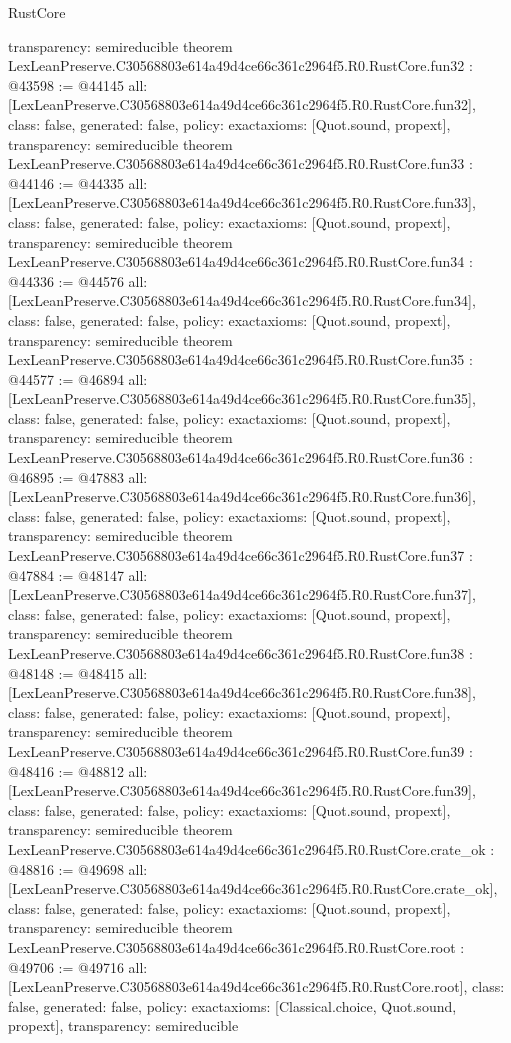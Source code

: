 \begin{lexlean}{RustCore}
\begin{coremodule}
{  transparency: semireducible
}
theorem LexLeanPreserve.C30568803e614a49d4ce66c361c2964f5.R0.RustCore.fun32 : @43598 := @44145 {
  all: [LexLeanPreserve.C30568803e614a49d4ce66c361c2964f5.R0.RustCore.fun32],
  class: false,
  generated: false,
  policy: exact{axioms: [Quot.sound, propext]},
  transparency: semireducible
}
theorem LexLeanPreserve.C30568803e614a49d4ce66c361c2964f5.R0.RustCore.fun33 : @44146 := @44335 {
  all: [LexLeanPreserve.C30568803e614a49d4ce66c361c2964f5.R0.RustCore.fun33],
  class: false,
  generated: false,
  policy: exact{axioms: [Quot.sound, propext]},
  transparency: semireducible
}
theorem LexLeanPreserve.C30568803e614a49d4ce66c361c2964f5.R0.RustCore.fun34 : @44336 := @44576 {
  all: [LexLeanPreserve.C30568803e614a49d4ce66c361c2964f5.R0.RustCore.fun34],
  class: false,
  generated: false,
  policy: exact{axioms: [Quot.sound, propext]},
  transparency: semireducible
}
theorem LexLeanPreserve.C30568803e614a49d4ce66c361c2964f5.R0.RustCore.fun35 : @44577 := @46894 {
  all: [LexLeanPreserve.C30568803e614a49d4ce66c361c2964f5.R0.RustCore.fun35],
  class: false,
  generated: false,
  policy: exact{axioms: [Quot.sound, propext]},
  transparency: semireducible
}
theorem LexLeanPreserve.C30568803e614a49d4ce66c361c2964f5.R0.RustCore.fun36 : @46895 := @47883 {
  all: [LexLeanPreserve.C30568803e614a49d4ce66c361c2964f5.R0.RustCore.fun36],
  class: false,
  generated: false,
  policy: exact{axioms: [Quot.sound, propext]},
  transparency: semireducible
}
theorem LexLeanPreserve.C30568803e614a49d4ce66c361c2964f5.R0.RustCore.fun37 : @47884 := @48147 {
  all: [LexLeanPreserve.C30568803e614a49d4ce66c361c2964f5.R0.RustCore.fun37],
  class: false,
  generated: false,
  policy: exact{axioms: [Quot.sound, propext]},
  transparency: semireducible
}
theorem LexLeanPreserve.C30568803e614a49d4ce66c361c2964f5.R0.RustCore.fun38 : @48148 := @48415 {
  all: [LexLeanPreserve.C30568803e614a49d4ce66c361c2964f5.R0.RustCore.fun38],
  class: false,
  generated: false,
  policy: exact{axioms: [Quot.sound, propext]},
  transparency: semireducible
}
theorem LexLeanPreserve.C30568803e614a49d4ce66c361c2964f5.R0.RustCore.fun39 : @48416 := @48812 {
  all: [LexLeanPreserve.C30568803e614a49d4ce66c361c2964f5.R0.RustCore.fun39],
  class: false,
  generated: false,
  policy: exact{axioms: [Quot.sound, propext]},
  transparency: semireducible
}
theorem LexLeanPreserve.C30568803e614a49d4ce66c361c2964f5.R0.RustCore.crate_ok : @48816 := @49698 {
  all: [LexLeanPreserve.C30568803e614a49d4ce66c361c2964f5.R0.RustCore.crate_ok],
  class: false,
  generated: false,
  policy: exact{axioms: [Quot.sound, propext]},
  transparency: semireducible
}
theorem LexLeanPreserve.C30568803e614a49d4ce66c361c2964f5.R0.RustCore.root : @49706 := @49716 {
  all: [LexLeanPreserve.C30568803e614a49d4ce66c361c2964f5.R0.RustCore.root],
  class: false,
  generated: false,
  policy: exact{axioms: [Classical.choice, Quot.sound, propext]},
  transparency: semireducible
}


\end{coremodule}
\end{lexlean}
